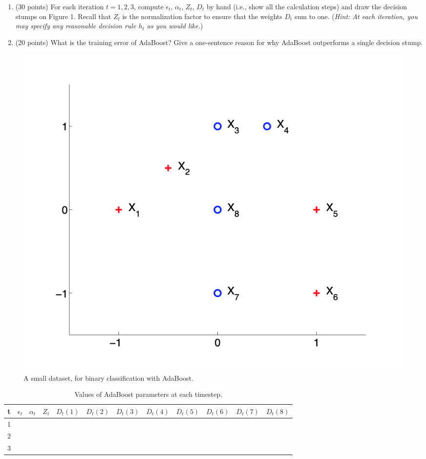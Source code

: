 \documentclass[twoside,10pt]{article}
\begin{document}
\begin{enumerate}
\begin{enumerate}
\item (30 points) For each iteration $t = 1, 2, 3$, compute $\epsilon_t$, $\alpha_t$, $Z_t$, $D_t$ by hand (i.e., show all the calculation steps) and draw the decision stumps on Figure 1. Recall that $Z_t$ is the normalization factor to ensure that the weights $D_t$ sum to one. ({\it Hint: At each iteration, you may specify  any reasonable decision rule $h_t$ as you would like.})

\item (20 points) What is the training error of AdaBoost? Give a one-sentence reason for why AdaBoost outperforms a single decision stump.
\end{enumerate}

\clearpage

\begin{figure}
\begin{center}
\includegraphics[width = 1\textwidth]{hw}
\end{center}
\caption{ A small dataset, for binary classification with AdaBoost.}
\end{figure}
\end{enumerate}

\begin{table}
\begin{center}
\caption{Values of AdaBoost parameters at each timestep.}
\vspace{0.1in}
\begin{tabular}{|c|c|c|c|c|c|c|c|c|c|c|c|}\hline
t & $\epsilon_t$ & $\alpha_t$ & $Z_t$ & $D_t(1)$ & $D_t(2)$ & $D_t(3)$ & $D_t(4)$ & $D_t(5)$ & $D_t(6)$ & $D_t(7)$ & $D_t(8)$ \\\hline
1 & & & & & & & & & & & \\
2 & & & & & & & & & & &\\
3 & & & & & & & & & & & \\\hline
\end{tabular}
\end{center}
\end{table}
\end{document}

